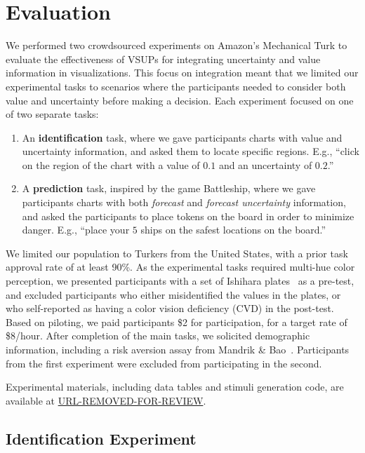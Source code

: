 \section{Evaluation}
\conditionFig

We performed two crowdsourced experiments on Amazon's Mechanical Turk to evaluate the effectiveness of VSUPs for integrating uncertainty and value information in visualizations. This focus on integration meant that we limited our experimental tasks to scenarios where the participants needed to consider both value and uncertainty before making a decision. Each experiment focused on one of two separate tasks:

\begin{enumerate}
	\item An \textbf{identification} task, where we gave participants charts with value and uncertainty information, and asked them to locate specific regions. E.g., ``click on the region of the chart with a value of $0.1$ and an uncertainty of $0.2$.''
	\item A \textbf{prediction} task, inspired by the game Battleship, where we gave participants charts with both \emph{forecast} and \emph{forecast uncertainty} information, and asked the participants to place tokens on the board in order to minimize danger. E.g., ``place your $5$ ships on the safest locations on the board.''
\end{enumerate}

We limited our population to Turkers from the United States, with a prior task approval rate of at least 90\%. As the experimental tasks required multi-hue color perception, we presented participants with a set of Ishihara plates~\cite{hardy1945tests} as a pre-test, and excluded participants who either misidentified the values in the plates, or who self-reported as having a color vision deficiency (CVD) in the post-test. Based on piloting, we paid participants \$2 for participation, for a target rate of \$8/hour. After completion of the main tasks, we solicited demographic information, including a risk aversion assay from Mandrik \& Bao~\cite{mandrik2005exploring}. Participants from the first experiment were excluded from participating in the second.

Experimental materials, including data tables and stimuli generation code, are available at \url{URL-REMOVED-FOR-REVIEW}.

\subsection{Identification Experiment}

